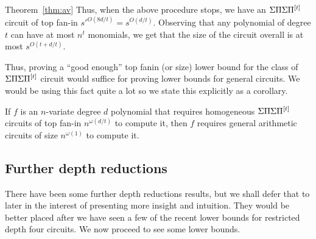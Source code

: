 \begin{proofof}{Theorem~\ref{thm:av}}
Thus, when the above procedure stops, we have an $\Sigma\Pi\Sigma\Pi^{[t]}$ circuit of top fan-in $s'^{O(8d/t)} = s^{O(d/t)}$. Observing that any polynomial of degree $t$ can have at most $n^t$ monomials, we get that the size of the circuit overall is at most $s^{O(t + d/t)}$. 
\end{proofof}

Thus, proving a ``good enough'' top fanin (or size) lower bound for the class of $\Sigma\Pi\Sigma\Pi^{[t]}$ circuit would suffice for proving lower bounds for general circuits. We would be using this fact quite a lot so we state this explicitly as a corollary. 

\begin{corollary}\label{cor:av}
If $f$ is an $n$-variate degree $d$ polynomial that requires homogeneous $\Sigma\Pi\Sigma\Pi^{[t]}$ circuits of top fan-in $n^{\omega(d/t)}$ to compute it, then $f$ requires general arithmetic circuits of size $n^{\omega(1)}$ to compute it. 
\end{corollary}

\subsection*{Further depth reductions}

There have been some further depth reductions results, but we shall defer that to later in the interest of presenting more insight and intuition. They would be better placed after we have seen a few of the recent lower bounds for restricted depth four circuits. We now proceed to see some lower bounds. 



